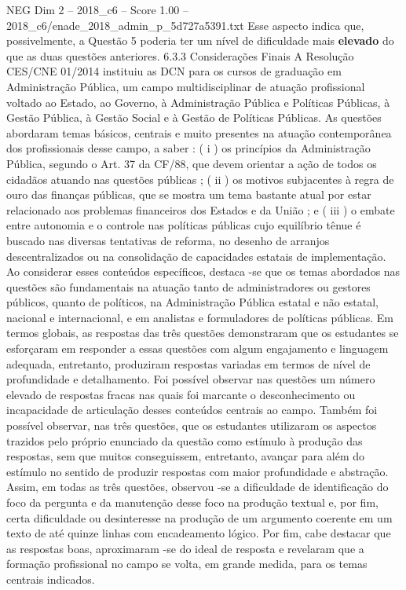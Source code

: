 \begin{textsample}{NEG Dim 2 – 2018\_c6 – Score 1.00 – 2018\_c6/enade\_2018\_admin\_p\_5d727a5391.txt}
Esse aspecto indica que, possivelmente, a Questão 5 poderia ter um nível de dificuldade mais \textbf{elevado} do que as duas questões anteriores. 6.3.3 Considerações Finais A Resolução CES/CNE 01/2014 instituiu as DCN para os cursos de graduação em Administração Pública, um campo multidisciplinar de atuação profissional voltado ao Estado, ao Governo, à Administração Pública e Políticas Públicas, à Gestão Pública, à Gestão Social e à Gestão de Políticas Públicas.
As questões abordaram temas básicos, centrais e muito presentes na atuação contemporânea dos profissionais desse campo, a saber : ( i ) os princípios da Administração Pública, segundo o Art. 37 da CF/88, que devem orientar a ação de todos os cidadãos atuando nas questões públicas ; ( ii ) os motivos subjacentes à regra de ouro das finanças públicas, que se mostra um tema bastante atual por estar relacionado aos problemas financeiros dos Estados e da União ; e ( iii ) o embate entre autonomia e o controle nas políticas públicas cujo equilíbrio tênue é buscado nas diversas tentativas de reforma, no desenho de arranjos descentralizados ou na consolidação de capacidades estatais de implementação.
Ao considerar esses conteúdos específicos, destaca -se que os temas abordados nas questões são fundamentais na atuação tanto de administradores ou gestores públicos, quanto de políticos, na Administração Pública estatal e não estatal, nacional e internacional, e em analistas e formuladores de políticas públicas.
Em termos globais, as respostas das três questões demonstraram que os estudantes se esforçaram em responder a essas questões com algum engajamento e linguagem adequada, entretanto, produziram respostas variadas em termos de nível de profundidade e detalhamento.
Foi possível observar nas questões um número elevado de respostas fracas nas quais foi marcante o desconhecimento ou incapacidade de articulação desses conteúdos centrais ao campo.
Também foi possível observar, nas três questões, que os estudantes utilizaram os aspectos trazidos pelo próprio enunciado da questão como estímulo à produção das respostas, sem que muitos conseguissem, entretanto, avançar para além do estímulo no sentido de produzir respostas com maior profundidade e abstração.
Assim, em todas as três questões, observou -se a dificuldade de identificação do foco da pergunta e da manutenção desse foco na produção textual e, por fim, certa dificuldade ou desinteresse na produção de um argumento coerente em um texto de até quinze linhas com encadeamento lógico.
Por fim, cabe destacar que as respostas boas, aproximaram -se do ideal de resposta e revelaram que a formação profissional no campo se volta, em grande medida, para os temas centrais indicados.

\end{textsample}
